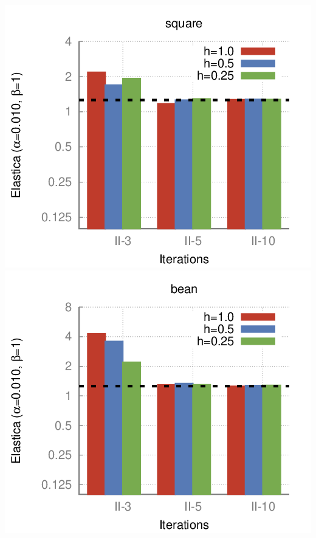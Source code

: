 \begin{frame}
\begin{minipage}{0.49\textwidth}
\end{minipage}	
\begin{minipage}{0.49\textwidth}
\center
\includegraphics[scale=0.25]{figures/combinatorial-elastica/flow/ii/elastica/len_pen_0.01000/jonctions_1/curve_segs_4/best/gs_0.25000/square-bars.png}\\[0.6em]
\includegraphics[scale=0.25]{figures/combinatorial-elastica/flow/ii/elastica/len_pen_0.01000/jonctions_1/curve_segs_4/best/gs_0.25000/bean-bars.png}
\end{minipage}
\end{frame}

